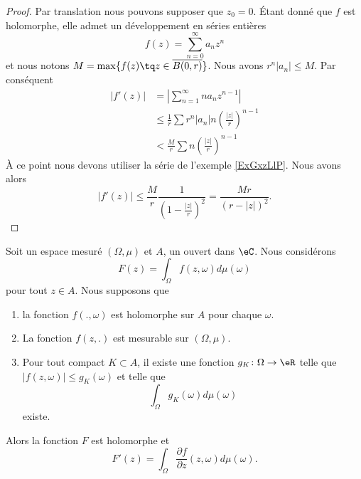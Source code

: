 \begin{proof}
    Par translation nous pouvons supposer que \( z_0=0\). Étant donné que \( f\) est holomorphe, elle admet un développement en séries entières
    \begin{equation}
        f(z)=\sum_{n=0}^{\infty}a_nz^n
    \end{equation}
    et nous notons \( M=\max\{ f(z)\tq z\in \overline{ B(0,r) } \}\). Nous avons\cite{Holomorphieus} \( r^n| a_n |\leq M\). Par conséquent
    \begin{subequations}
        \begin{align}
            | f'(z) |&=\left| \sum_{n=1}^{\infty}na_nz^{n-1} \right| \\
            &\leq\frac{1}{ r }\sum r^n| a_n |n\left( \frac{ | z | }{ r } \right)^{n-1}\\
            &<\frac{ M }{ r }\sum n\left( \frac{ | z | }{ r } \right)^{n-1}
        \end{align}
    \end{subequations}
    À ce point nous devons utiliser la série de l'exemple \ref{ExGxzLlP}. Nous avons alors
    \begin{equation}
        | f'(z) |\leq \frac{ M }{ r }\frac{ 1 }{ \left( 1-\frac{ | z | }{ r } \right)^2 }=\frac{ Mr }{ (r-| z |)^2 }.
    \end{equation}
\end{proof}

\begin{theorem} \label{ThopCLOVN}
    Soit un espace mesuré \( (\Omega,\mu)\) et \( A\), un ouvert dans \( \eC\). Nous considérons 
    \begin{equation}
        F(z)=\int_{\Omega}f(z,\omega)d\mu(\omega)
    \end{equation}
    pour tout \( z\in A\). Nous supposons que
    \begin{enumerate}
        \item
            la fonction \( f(.,\omega)\) est holomorphe sur \( A\) pour chaque \( \omega\).
        \item
            La fonction \( f(z,.)\) est mesurable sur \( (\Omega,\mu)\).
        \item
            Pour tout compact \( K\subset A\), il existe une fonction \( g_K\colon \Omega\to \eR\) telle que \( | f(z,\omega) |\leq g_K(\omega)\) et telle que
            \begin{equation}
                \int_{\Omega}g_K(\omega)d\mu(\omega)
            \end{equation}
            existe.
    \end{enumerate}
    Alors la fonction \( F\) est holomorphe et
    \begin{equation}
        F'(z)=\int_{\Omega}\frac{ \partial f }{ \partial z }(z,\omega)d\mu(\omega).
    \end{equation}
\end{theorem}


